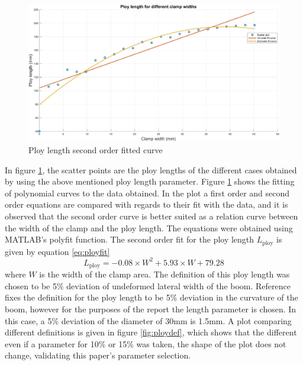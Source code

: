 \begin{figure}[!hbt]
    \centering
    \includegraphics[width=15cm]{images/fitcurve.jpg}
    \caption{Ploy length second order fitted curve}
    \label{fig:fitcurve}
\end{figure}
In figure \ref{fig:fitcurve}, the scatter points are the ploy lengths of the different cases obtained by using the above mentioned ploy length parameter. Figure \ref{fig:fitcurve} shows the fitting of polynomial curves to the data obtained. In the plot a first order and second order equations are compared with regards to their fit with the data, and it is observed that the second order curve is better suited as a relation curve between the width of the clamp and the ploy length. The equations were obtained using MATLAB's polyfit function. The second order fit for the ploy length $L_{\mathrm{ploy}}$ is given by equation \ref{eq:ployfit}
\begin{equation}
    L_{\mathrm{ploy}}=-0.08 \times W^2+5.93 \times W+79.28
    \label{eq:ployfit}
\end{equation}
where $W$ is the width of the clamp area. 
The definition of this ploy length was chosen to be 5\% deviation of undeformed lateral width of the boom. Reference \cite{Yang2018} fixes the definition for the ploy length to be 5\% deviation in the curvature of the boom, however for the purposes of the report the length parameter is chosen. In this case, a 5\% deviation of the diameter of 30mm is 1.5mm.  A plot comparing different definitions is given in figure \ref{fig:ploydef}, which shows that the different even if a parameter for 10\% or 15\%  was taken, the shape of the plot does not change, validating this paper's parameter selection.  
